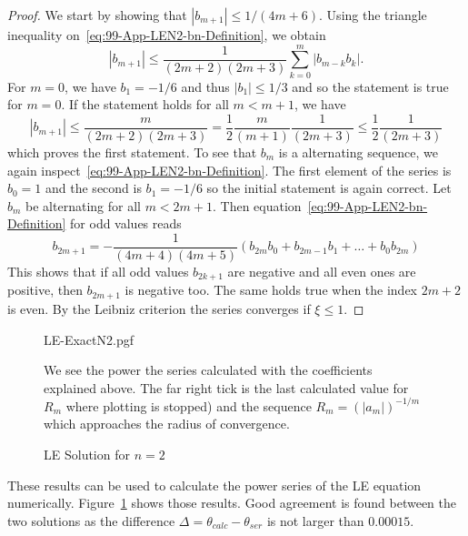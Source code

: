 \begin{proof}
	We start by showing that $|b_{m+1}|\leq1/(4m+6)$.
	Using the triangle inequality on~\ref{eq:99-App-LEN2-bn-Definition}, we obtain
	\begin{equation}
		|b_{m+1}| \leq \frac{1}{(2m+2)(2m+3)}\sum\limits_{k=0}^m|b_{m-k}b_k|.
		\label{eq:99-App-LE-New-Recursive-bn}
	\end{equation}
	For $m=0$, we have $b_1=-1/6$ and thus $|b_1|\leq1/3$ and so the statement is true for $m=0$.
	If the statement holds for all $m<m+1$, we have
	\begin{equation}
		|b_{m+1}| \leq \frac{m}{(2m+2)(2m+3)} = \frac{1}{2}\frac{m}{(m+1)}\frac{1}{(2m+3)}
		\leq\frac{1}{2}\frac{1}{(2m+3)}
		\label{eq:99-App-LE-New-Bn-Inequality}
	\end{equation}
	which proves the first statement.
	To see that $b_m$ is a alternating sequence, we again inspect~\ref{eq:99-App-LEN2-bn-Definition}.
	The first element of the series is $b_0=1$ and the second is $b_1=-1/6$ so the initial statement is again correct.
	Let $b_m$ be alternating for all $m<2m+1$.
	Then equation~\ref{eq:99-App-LEN2-bn-Definition} for odd values reads
	\begin{equation}
		b_{2m+1} = -\frac{1}{(4 m+4)(4 m+5)}\left(b_{2m}b_0+b_{2m-1}b_1+\dots+b_0 b_{2m}\right)
		\label{eq:99-App-LE-Bn-Recursion}
	\end{equation}
	This shows that if all odd values $b_{2k+1}$ are negative and all even ones are positive,
	then $b_{2m+1}$ is negative too.
	The same holds true when the index $2m+2$ is even.
	By the Leibniz criterion the series converges if $\xi\leq1$.
\end{proof}
\begin{figure}[H]
	{\centering
	{LE-ExactN2.pgf}
	}%
	\caption[ Solution for $n=2$]{\ac{LE} Solution for $n=2$}
	\label{fig:99-App-Plt-LEN2-Plot}
	\small
	We see the power the series calculated with the coefficients explained above.
	The far right tick is the last calculated value for $R_m$ where plotting is stopped) and the sequence $R_m=(|a_m|)^{-1/m}$ which approaches the radius of convergence.
\end{figure}\noindent
These results can be used to calculate the power series of the \ac {LE} equation numerically.
Figure~\ref{fig:99-App-Plt-LEN2-Plot} shows those results.
Good agreement is found between the two solutions
as the difference $\Delta=\theta_{calc}-\theta_{ser}$ is not larger than $0.00015$.
